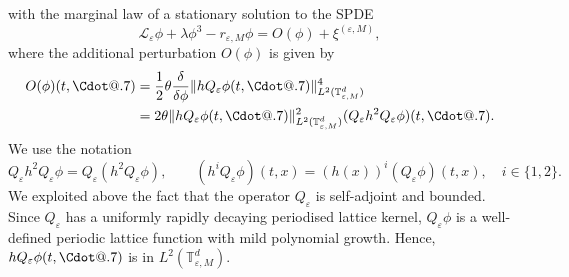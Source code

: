 \documentclass{article}
\makeatletter
\numberwithin{equation}{section}
\newcommand*\Cdot{{\mathpalette\Cdot@{.7}}}
\newcommand*\Cdot@[2]{\mathbin{\vcenter{\hbox{\scalebox{#2}{\hspace{0.1mm}$\m@th#1\bullet$\hspace{0.1mm}}}}}}
\theoremstyle{plain}
\theoremstyle{definition}
\makeatother
\begin{document}
with the marginal law of a stationary solution to the SPDE
\begin{equation}
  \mathcal{L}_{\varepsilon} \phi  + \lambda \phi ^3  - r_{\varepsilon, M}
  \phi  = O (\phi ) + \xi^{(\varepsilon, M)}, \label{eq:tilted-spde}
\end{equation}
where the additional perturbation $O (\phi)$ is given by
\begin{align*}
	O (\phi) (t, \Cdot) &=  \frac12 \theta \frac{\delta}{\delta
		\phi} \| h Q_{\varepsilon} \phi (t, \Cdot) \|_{L^2
		(\mathbb{T}^d_{\varepsilon, M})}^4
		\\
		&= 2 \theta \| h Q_{\varepsilon} \phi
	(t, \Cdot) \|_{L^2 (\mathbb{T}^d_{\varepsilon, M})}^2 
	(Q_{\varepsilon} h^2 Q_{\varepsilon} \phi) (t, \Cdot) .
\end{align*}
We use the notation
\[ Q_{\varepsilon} h^2 Q_{\varepsilon} \phi = 
   Q_{\varepsilon} (h^2 Q_{\varepsilon} \phi), \qquad (h^i Q_{\varepsilon}
   \phi)  (t, x) = (h  (x))^i  (Q_{\varepsilon} \phi)
    (t, x), \quad i \in \{ 1, 2 \} . \]
We exploited above the fact that the operator $Q_{\varepsilon}$ is
self-adjoint and bounded. Since $Q_{\varepsilon}$ has a uniformly rapidly
decaying periodised lattice kernel, $Q_{\varepsilon} \phi$ is a well-defined
periodic lattice function with mild polynomial growth. Hence, $h
Q_{\varepsilon} \phi (t, \Cdot)$ is in $L^2 (\mathbb{T}^d_{\varepsilon, M})$.
\end{document}
